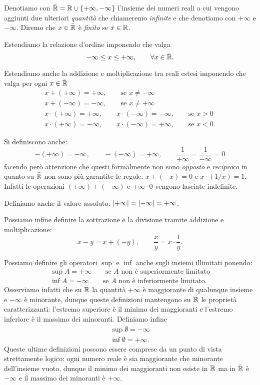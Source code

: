 \begin{definition}
\mymargin{$\bar\RR$}%
\index{$\bar{\RR}$}
Denotiamo con $\bar {{\mathbb R}}={\mathbb R} \cup {\left\{ +\infty, -\infty \right\}}$ l'insieme dei numeri reali
\mymargin{$+\infty$, $-\infty$}%
\index{$+\infty$, $-\infty$}
a cui vengono aggiunti due ulteriori \emph{quantità} che chiameremo
\emph{infinite} e che denotiamo con $+\infty$ e $-\infty$.
Diremo che $x\in \bar {{\mathbb R}}$ è \emph{finito} se $x\in {\mathbb R}$.
\end{definition}


Estendiamo la relazione d'ordine imponendo che valga
\[
  -\infty \le x \le +\infty, \qquad \forall x \in \bar{{\mathbb R}}.
\]

Estendiamo anche la addizione e moltiplicazione
tra reali estesi imponendo che valga per ogni $x\in \bar {{\mathbb R}}$
\begin{gather*}
  x + (+\infty) = +\infty, \qquad \text{se $x\neq -\infty$}\\
  x + (-\infty) = -\infty, \qquad \text{se $x\neq +\infty$}\\
  x \cdot (+\infty) = +\infty, \qquad
  x \cdot (-\infty) = -\infty, \qquad \text{se $x>0$} \\
  x \cdot (+\infty) = -\infty, \qquad
  x \cdot (-\infty) = +\infty, \qquad \text{se $x<0$}.
\end{gather*}

Si definiscono anche:
\[
 -(+\infty) = -\infty, \qquad
 -(-\infty) = +\infty, \qquad
 \frac{1}{+\infty} = \frac{1}{-\infty}=0
\]
facendo però attenzione che
questi formalmente non sono \emph{opposto}
e \emph{reciproco} in quanto
su $\bar \RR$ non sono più garantite
le regole: $x + (-x) = 0$ e $x \cdot (1/x) = 1$.
Infatti
le operazioni $(+\infty) + (-\infty)$ e $+\infty \cdot 0$ vengono
lasciate indefinite.

Definiamo anche il valore assoluto: ${\left|+\infty\right|} = {\left|-\infty\right|} = +\infty$.

Possiamo infine definire la sottrazione e la divisione tramite
addizione e moltiplicazione:
\[
  x - y = x + (-y), \qquad \frac{x}{y} = x \cdot \frac{1}{y}.
\]

Possiamo definire gli operatori $\sup$ e $\inf$
anche sugli insiemi illimitati ponendo:
\begin{align*}
  \sup A = +\infty \qquad \text{se $A$ non è superiormente limitato}\\
  \inf A = -\infty \qquad \text{se $A$ non è inferiormente limitato}.
\end{align*}
Osserviamo infatti che su $\bar \RR$ la quantità $+\infty$
è maggiorante di qualunque insieme e $-\infty$ è minorante, dunque
queste definizioni mantengono su $\bar \RR$ le proprietà caratterizzanti:
l'estremo superiore è il minimo dei maggioranti e
l'estremo inferiore è il massimo dei minoranti.
Definiamo infine
\begin{align*}
  \sup \emptyset = -\infty\\
  \inf \emptyset = +\infty.
\end{align*}
Queste ultime definizioni possono essere comprese da un punto di vista
strettamente logico: ogni numero reale è sia maggiorante che minorante
dell'insieme vuoto, dunque il minimo dei maggioranti non esiste in ${\mathbb R}$
ma in $\bar \RR$ è $-\infty$
e il massimo dei minoranti è $+\infty$.

